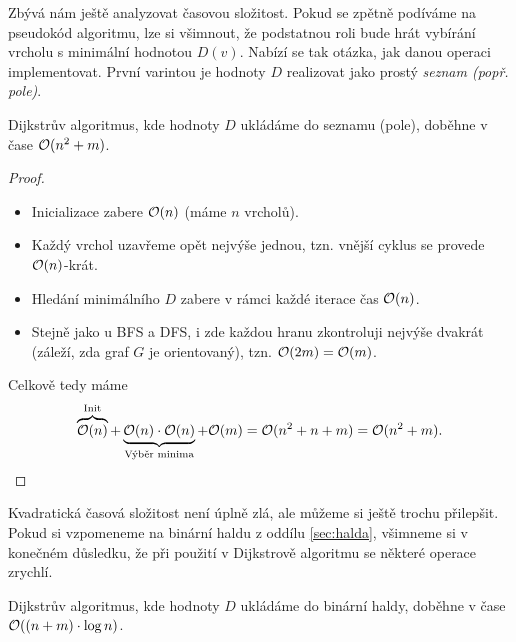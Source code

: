 Zbývá nám ještě analyzovat časovou složitost. Pokud se zpětně podíváme na pseudokód algoritmu, lze si všimnout, že podstatnou roli bude hrát vybírání vrcholu s minimální hodnotou $D(v)$. Nabízí se tak otázka, jak danou operaci implementovat. První varintou je hodnoty $D$ realizovat jako prostý \emph{seznam (popř. pole)}.
\begin{theorem}
    Dijkstrův algoritmus, kde hodnoty $D$ ukládáme do seznamu (pole), doběhne v čase $\mathcal{O}(n^2+m)$.
\end{theorem}
\begin{proof}
    \begin{itemize}
        \item Inicializace zabere $\mathcal{O}(n)$ (máme $n$ vrcholů).
        \item Každý vrchol uzavřeme opět nejvýše jednou, tzn. vnější cyklus se provede $\mathcal{O}(n)$-krát.
        \item Hledání minimálního $D$ zabere v rámci každé iterace čas $\mathcal{O}(n)$.
        \item Stejně jako u BFS a DFS, i zde každou hranu zkontroluji nejvýše dvakrát (záleží, zda graf $G$ je orientovaný), tzn. $\mathcal{O}(2m)=\mathcal{O}(m)$.
    \end{itemize}
    Celkově tedy máme
    \[\overbrace{\mathcal{O}(n)}^{\text{Init}}+\underbrace{\mathcal{O}(n)\cdot\mathcal{O}(n)}_{\text{Výběr minima}}+\mathcal{O}(m)=\mathcal{O}(n^2+n+m)=\mathcal{O}(n^2+m).\]
\end{proof}
Kvadratická časová složitost není úplně zlá, ale můžeme si ještě trochu přilepšit. Pokud si vzpomeneme na binární haldu z oddílu \ref{sec:halda}, všimneme si v konečném důsledku, že při použití v Dijkstrově algoritmu se některé operace zrychlí.
\begin{theorem}
    Dijkstrův algoritmus, kde hodnoty $D$ ukládáme do binární haldy, doběhne v čase $\mathcal{O}((n+m)\cdot\log{n})$.
\end{theorem}
